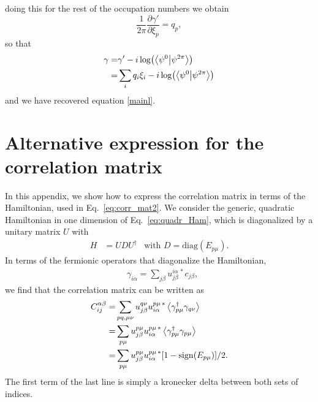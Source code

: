 \documentclass[twocolumn,amsmath,longbibliography,amssymb,superscriptaddress]{revtex4-1}
\begin{document}
doing this for the rest of the occupation numbers we obtain 
\begin{equation}
\frac{1}{2\pi}\frac{\partial \gamma'}{\partial \xi_p} = q_p,
\end{equation}
so that 
\begin{align*}
\gamma =& \gamma' - i\log(\bra{\psi^0}\ket{\psi^{2\pi}})\\
=& \sum_{i}q_i \xi_i - i\log(\bra{\psi^0}\ket{\psi^{2\pi}})\\
\end{align*}
and we have recovered equation \ref{mainl}. 

\section{Alternative expression for the correlation matrix}\label{app:CM}
In this appendix, we show how to express the correlation matrix in terms of the Hamiltonian, used in Eq.~\eqref{eq:corr_mat2}. 
We consider the generic, quadratic Hamiltonian in one dimension of Eq.~\ref{eq:quadr_Ham}, which is diagonalized by a unitary matrix $U$ with 
	\begin{align}\label{eq:D}
	H&=UDU^\dagger& \mbox{with } D=\mbox{diag}(E_{p\mu}).
	\end{align} 
In terms of the fermionic operators that diagonalize the Hamiltonian, 
\begin{align}
& \gamma_{i\alpha} = \sum_{j\beta}u_{j\beta}^{i\alpha \, \ast} c_{j\beta},
\end{align}
we find that the correlation matrix can be written as 
\begin{align}\label{eq:corr_mat}
C_{ij}^{\alpha \beta} =& \sum_{pq,\mu\nu} u^{q\nu }_{j\beta} u^{p\mu \, \ast}_{i\alpha} \expval{\gamma^\dagger_{p\mu} \gamma_{q\nu} }\nonumber \\
=&  \sum_{p\mu} u^{p\mu }_{j\beta} u^{p\mu \, \ast}_{i\alpha} \expval{\gamma^\dagger_{p\mu} \gamma_{p\mu} }\nonumber \\
=&  \sum_{p\mu} u^{p\mu }_{j\beta} u^{p\mu \, \ast}_{i\alpha} [1-{\rm sign}(E_{p\mu})]/2.
\end{align}
The first term of the last line is simply a kronecker delta between both sets of indices. 
\end{document}
